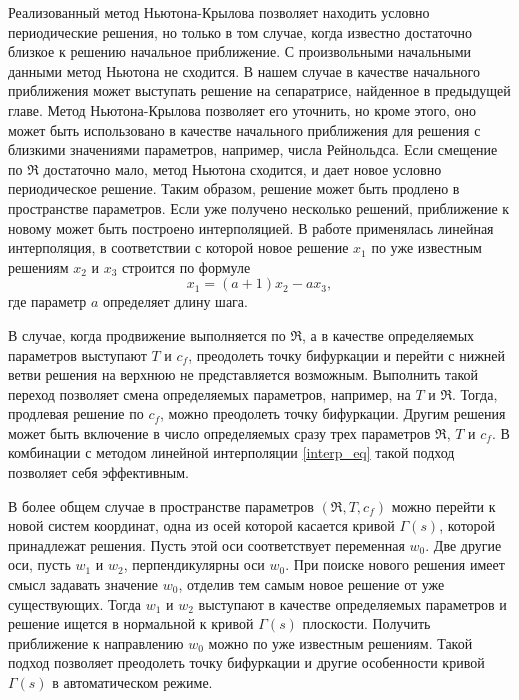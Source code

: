 Реализованный метод Ньютона-Крылова позволяет находить условно периодические решения, но только в том случае, когда известно достаточно близкое к решению начальное приближение. С произвольными начальными данными метод Ньютона не сходится. В нашем случае в качестве начального приближения может выступать решение на сепаратрисе, найденное в предыдущей главе. Метод Ньютона-Крылова позволяет его уточнить, но кроме этого, оно может быть использовано в качестве начального приближения для решения с близкими значениями параметров, например, числа Рейнольдса. Если смещение по $\Re$ достаточно мало, метод Ньютона сходится, и дает новое условно периодическое решение. Таким образом, решение может быть продлено в пространстве параметров. Если уже получено несколько решений, приближение к новому может быть построено интерполяцией. В работе применялась линейная интерполяция, в соответствии с которой новое решение $x_1$ по уже известным решениям $x_2$ и $x_3$ строится по формуле
\begin{equation} \label{interp_eq}
x_1 = (a + 1) x_2 - a x_3, 
\end{equation}
где параметр $a$ определяет длину шага. 

В случае, когда продвижение выполняется по $\Re$, а в качестве определяемых параметров выступают $T$ и $c_f$, преодолеть точку бифуркации и перейти с нижней ветви решения на верхнюю не представляется возможным. Выполнить такой переход позволяет смена определяемых параметров, например, на $T$ и $\Re$. Тогда, продлевая решение по $c_f$, можно преодолеть точку бифуркации. Другим решения может быть включение в число определяемых сразу трех параметров $\Re$, $T$ и $c_f$.  В комбинации с методом линейной интерполяции \eqref{interp_eq} такой подход позволяет себя эффективным.

В более общем случае в пространстве параметров $(\Re, T, c_f)$ можно перейти к новой систем координат, одна из осей которой касается кривой $\Gamma(s)$, которой принадлежат решения. Пусть этой оси соответствует переменная $w_0$. Две другие оси, пусть $w_1$ и $w_2$, перпендикулярны оси $w_0$. При поиске нового решения имеет смысл задавать значение $w_0$, отделив тем самым новое решение от уже существующих. Тогда $w_1$ и $w_2$ выступают в качестве определяемых параметров и решение ищется в нормальной к кривой $\Gamma(s)$ плоскости. Получить приближение к направлению $w_0$ можно по уже известным решениям. Такой подход позволяет преодолеть точку бифуркации и другие особенности кривой $\Gamma(s)$ в автоматическом режиме. 

